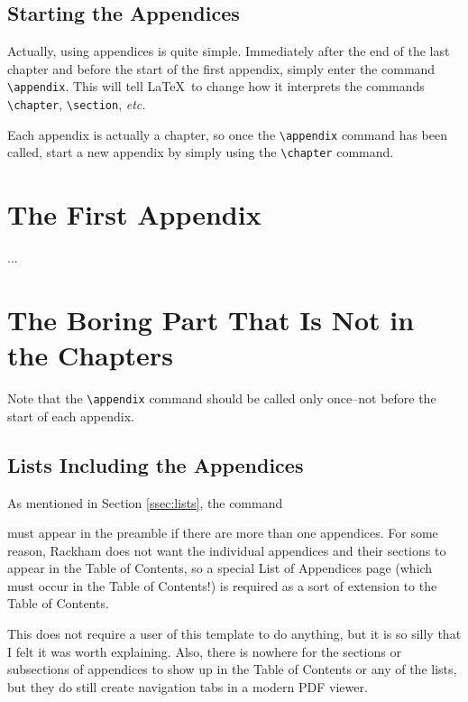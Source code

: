 \documentclass[thesis]{../cls/thesis-umich}
\begin{document}
\section{Starting the Appendices}
Actually, using appendices is quite simple.  Immediately after the end
of the last chapter and before the start of the first appendix, simply
enter the command \verb|\appendix|.  This will tell \LaTeX~to change
how it interprets the commands \verb|\chapter|, \verb|\section|,
\textit{etc.}

Each appendix is actually a chapter, so once the \verb|\appendix|
command has been called, start a new appendix by simply using the
\verb|\chapter| command.
\begin{code}
\appendix
\chapter{The First Appendix}
...

\chapter{The Boring Part That Is Not in the Chapters}
\end{code}

Note that the \verb|\appendix| command should be called only
once--not before the start of each appendix.

\section{Lists Including the Appendices}
As mentioned in Section \ref{ssec:lists}, the command
\begin{code}
\showlistofappendices
\end{code}
must appear in the preamble if there are more than one appendices.  For
some reason, Rackham does not want the individual appendices and their
sections to appear in the Table of Contents, so a special List of
Appendices page (which must occur in the Table of Contents!) is required
as a sort of extension to the Table of Contents.

This does not require a user of this template to do anything, but it is
so silly that I felt it was worth explaining.  Also, there is nowhere
for the sections or subsections of appendices to show up in the Table of
Contents or any of the lists, but they do still create navigation tabs
in a modern PDF viewer.





\end{document}
